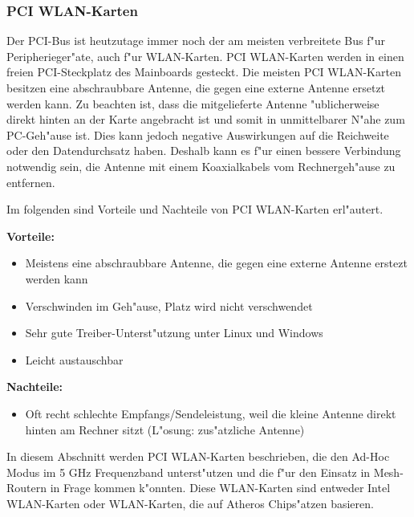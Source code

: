 \subsubsection{PCI WLAN-Karten}

Der PCI-Bus ist heutzutage immer noch der am meisten verbreitete Bus
f"ur Peripherieger"ate, auch f"ur WLAN-Karten. PCI WLAN-Karten werden in
einen freien PCI-Steckplatz des Mainboards gesteckt. Die meisten
PCI WLAN-Karten besitzen eine abschraubbare Antenne, die gegen eine
externe Antenne ersetzt werden kann. Zu beachten ist, dass die
mitgelieferte Antenne "ublicherweise direkt hinten an der Karte angebracht
ist und somit in unmittelbarer N"ahe zum PC-Geh"ause ist. Dies kann
jedoch negative Auswirkungen auf die Reichweite oder den Datendurchsatz
haben. Deshalb kann es f"ur einen bessere Verbindung notwendig sein,
die Antenne mit einem Koaxialkabels vom Rechnergeh"ause zu entfernen.

Im folgenden sind Vorteile und Nachteile von PCI WLAN-Karten erl"autert.

\textbf{Vorteile:}

\begin{itemize}
\item Meistens eine abschraubbare Antenne, die gegen eine externe Antenne
erstezt werden kann
\item Verschwinden im Geh"ause, Platz wird nicht verschwendet 
\item Sehr gute Treiber-Unterst"utzung unter Linux und Windows
\item Leicht austauschbar
\end{itemize}

\textbf{Nachteile:}

\begin{itemize}
\item Oft recht schlechte Empfangs/Sendeleistung, weil die kleine Antenne
direkt hinten am Rechner sitzt (L"osung: zus"atzliche Antenne)
\end{itemize}

In diesem Abschnitt werden PCI WLAN-Karten beschrieben, die den Ad-Hoc
Modus im 5 GHz Frequenzband unterst"utzen und die f"ur den Einsatz in
Mesh-Routern in Frage kommen k"onnten. Diese WLAN-Karten sind entweder
Intel WLAN-Karten oder WLAN-Karten, die auf Atheros Chips"atzen basieren.

